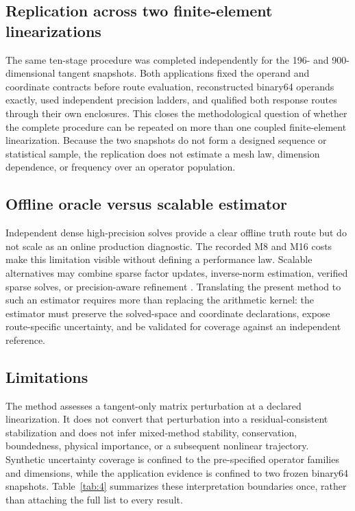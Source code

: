 \documentclass[preprint,12pt]{elsarticle}
\begin{document}
\subsection{Replication across two finite-element linearizations}

The same ten-stage procedure was completed independently for the 196- and 900-dimensional tangent snapshots. Both applications fixed the operand and coordinate contracts before route evaluation, reconstructed binary64 operands exactly, used independent precision ladders, and qualified both response routes through their own enclosures. This closes the methodological question of whether the complete procedure can be repeated on more than one coupled finite-element linearization. Because the two snapshots do not form a designed sequence or statistical sample, the replication does not estimate a mesh law, dimension dependence, or frequency over an operator population.

\subsection{Offline oracle versus scalable estimator}

Independent dense high-precision solves provide a clear offline truth route but do not scale as an online production diagnostic. The recorded M8 and M16 costs make this limitation visible without defining a performance law. Scalable alternatives may combine sparse factor updates, inverse-norm estimation, verified sparse solves, or precision-aware refinement \cite{S12,S26,S27,S28,S31}. Translating the present method to such an estimator requires more than replacing the arithmetic kernel: the estimator must preserve the solved-space and coordinate declarations, expose route-specific uncertainty, and be validated for coverage against an independent reference.

\subsection{Limitations}

The method assesses a tangent-only matrix perturbation at a declared linearization. It does not convert that perturbation into a residual-consistent stabilization and does not infer mixed-method stability, conservation, boundedness, physical importance, or a subsequent nonlinear trajectory. Synthetic uncertainty coverage is confined to the pre-specified operator families and dimensions, while the application evidence is confined to two frozen binary64 snapshots. Table~\ref{tab:4} summarizes these interpretation boundaries once, rather than attaching the full list to every result.
\end{document}
